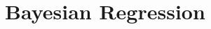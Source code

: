 \documentclass[../../Bayesian_Inference.tex]{subfiles}
\begin{document}
\chapter{Bayesian Regression}

 

 


\end{document}
